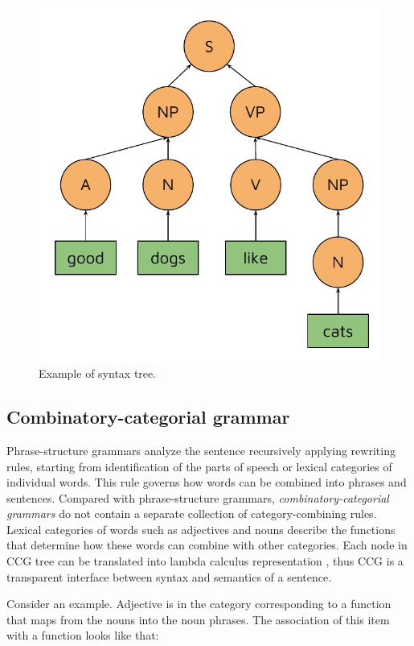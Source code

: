 \begin{figure}
\centering
\includegraphics{Figures/syntaxtree}
\decoRule
\caption[Syntax tree]{Example of syntax tree.}
\label{fig:syntax_tree}
\end{figure}

\subsection{Combinatory-categorial grammar}
Phrase-structure grammars analyze the sentence recursively applying rewriting rules, starting from identification of the parts of speech or lexical categories of individual words. This rule governs how words can be combined into phrases and sentences. Compared with phrase-structure grammars, \emph{combinatory-ca\-te\-go\-rial grammars} do not contain a separate collection of category-combining rules. Lexical categories of words such as adjectives and nouns describe the functions that determine how these words can combine with other categories. Each node in CCG tree can be translated into lambda calculus representation \parencite{artzi2013}, thus CCG is a transparent interface between syntax and semantics of a sentence.

Consider an example. Adjective  is in the category corresponding to a function that maps from the nouns into the noun phrases. The association of this item with a function looks like that:

